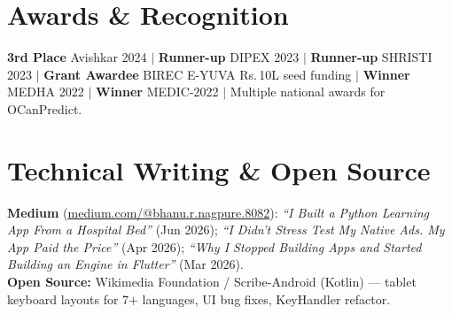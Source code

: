 \documentclass[letterpaper,11pt]{article}
\begin{document}
\section{Awards \& Recognition}
\vspace{2pt}
\small{
\textbf{3rd Place} Avishkar 2024 \;$|$\; \textbf{Runner-up} DIPEX 2023 \;$|$\; \textbf{Runner-up} SHRISTI 2023 \;$|$\; \textbf{Grant Awardee} BIREC E-YUVA Rs.\,10L seed funding \;$|$\; \textbf{Winner} MEDHA 2022 \;$|$\; \textbf{Winner} MEDIC-2022 \;$|$\; Multiple national awards for OCanPredict.
}

\section{Technical Writing \& Open Source}
\vspace{2pt}
\small{
\textbf{Medium} (\href{https://medium.com/@bhanu.r.nagpure.8082}{\underline{medium.com/@bhanu.r.nagpure.8082}}): \textit{``I Built a Python Learning App From a Hospital Bed''} (Jun 2026); \textit{``I Didn't Stress Test My Native Ads. My App Paid the Price''} (Apr 2026); \textit{``Why I Stopped Building Apps and Started Building an Engine in Flutter''} (Mar 2026).\\[4pt]
\textbf{Open Source:} Wikimedia Foundation / Scribe-Android (Kotlin) --- tablet keyboard layouts for 7+ languages, UI bug fixes, KeyHandler refactor.
}
\end{document}
